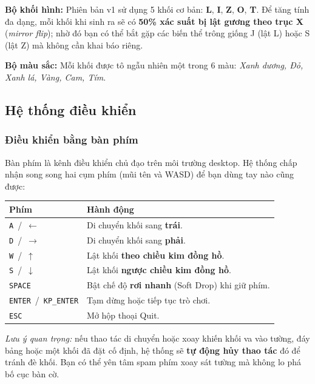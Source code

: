 \documentclass[12pt,a4paper]{article}
\begin{document}
\noindent\textbf{Bộ khối hình:} Phiên bản v1 sử dụng 5 khối cơ bản: \textbf{L}, \textbf{I}, \textbf{Z}, \textbf{O}, \textbf{T}. Để tăng tính đa dạng, mỗi khối khi sinh ra sẽ có \textbf{50\% xác suất bị lật gương theo trục X} (\textit{mirror flip}); nhờ đó bạn có thể bắt gặp các biến thể trông giống J (lật L) hoặc S (lật Z) mà không cần khai báo riêng.

\noindent\textbf{Bộ màu sắc:} Mỗi khối được tô ngẫu nhiên một trong 6 màu: \textit{Xanh dương, Đỏ, Xanh lá, Vàng, Cam, Tím}.

\subsection{Hệ thống điều khiển}

\subsubsection{Điều khiển bằng bàn phím}
Bàn phím là kênh điều khiển chủ đạo trên môi trường desktop. Hệ thống chấp nhận song song hai cụm phím (mũi tên và WASD) để bạn dùng tay nào cũng được:

\vspace{4pt}
\begin{tabularx}{\linewidth}{|l|X|}
    \hline
    \textbf{Phím} & \textbf{Hành động} \\
    \hline
    \texttt{A} \,/\, \texttt{$\leftarrow$}     & Di chuyển khối sang \textbf{trái}. \\
    \hline
    \texttt{D} \,/\, \texttt{$\rightarrow$}    & Di chuyển khối sang \textbf{phải}. \\
    \hline
    \texttt{W} \,/\, \texttt{$\uparrow$}       & Lật khối \textbf{theo chiều kim đồng hồ}. \\
    \hline
    \texttt{S} \,/\, \texttt{$\downarrow$}     & Lật khối \textbf{ngược chiều kim đồng hồ}. \\
    \hline
    \texttt{SPACE}                              & Bật chế độ \textbf{rơi nhanh} (Soft Drop) khi giữ phím. \\
    \hline
    \texttt{ENTER} \,/\, \texttt{KP\_ENTER}     & Tạm dừng hoặc tiếp tục trò chơi. \\
    \hline
    \texttt{ESC}                                & Mở hộp thoại Quit. \\
    \hline
\end{tabularx}

\vspace{4pt}
\noindent\textit{Lưu ý quan trọng:} nếu thao tác di chuyển hoặc xoay khiến khối va vào tường, đáy bảng hoặc một khối đã đặt cố định, hệ thống sẽ \textbf{tự động hủy thao tác} đó để tránh đè khối. Bạn có thể yên tâm spam phím xoay sát tường mà không lo phá bố cục bàn cờ.
\end{document}
